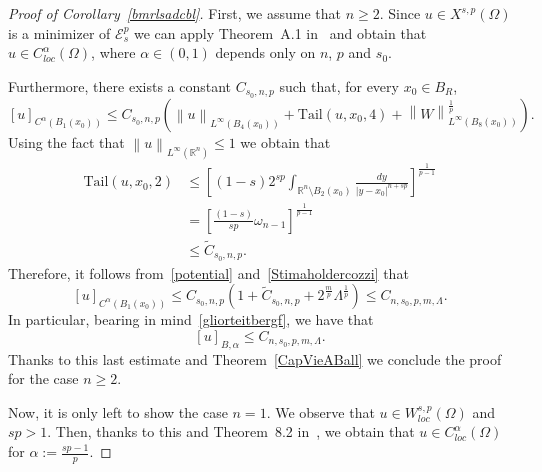 \documentclass[12pt]{article}
\newcommand{\R}{\mathbb{R}}
\numberwithin{equation}{section}
\renewcommand{\leq}{\leqslant}
\renewcommand{\geq}{\geqslant}
\begin{document}
\begin{proof}[Proof of Corollary~\ref{bmrlsadcbl}]
First, we assume that $n\geq 2$. Since $u\in X^{s,p}(\Omega)$ is a minimizer of $\mathcal{E}_s^p$ we can apply Theorem~A.1 in~\cite{DFVERPP} and obtain that $u\in C_{\textit{loc}}^\alpha(\Omega)$, where $\alpha\in (0,1)$ depends only on $n$, $p$ and $s_0$. 

Furthermore, there exists a constant $C_{s_0,n,p}$ such that, for every $x_0\in B_R$,
\begin{equation}\label{Stimaholdercozzi}
\left[u\right]_{C^{\alpha}\left(B_{1}(x_0)\right)} \leq C_{s_0,n,p} \left(\left\|u\right\|_{L^\infty(B_4(x_0))}+\mbox{Tail}(u,x_0,4)+\left\|W\right\|_{L^\infty(B_8(x_0))}^\frac{1}{p}\right).
\end{equation} 
Using the fact that $\left\|u\right\|_{L^\infty(\R^n)}\leq 1$ we obtain that 
\begin{equation*}
\begin{split}
\mbox{Tail}(u,x_0,2) &\leq  \left[(1-s)2^{sp} \int_{\R^n\setminus B_2(x_0)}\frac{dy}{\left|y-x_0\right|^{n+sp}}\right]^\frac{1}{p-1}\\
&=\left[\frac{(1-s)}{sp}\omega_{n-1}\right]^\frac{1}{p-1}\\
&\leq \tilde{C}_{s_0,n,p}. 
\end{split}
\end{equation*}
Therefore, it follows from~\eqref{potential} and~\eqref{Stimaholdercozzi} that 
\begin{equation*}
\left[u\right]_{C^{\alpha}(B_1(x_0))} \leq C_{s_0,n,p}\left(1+\tilde{C}_{s_0,n,p}+2^\frac{m}{p}\Lambda^\frac{1}{p}\right) \leq C_{n,s_0,p,m,\Lambda}. 
\end{equation*}
In particular, bearing in mind~\eqref{gliorteitbergf}, we have that
\begin{equation*}
\left[u\right]_{B,\alpha}\leq C_{n,s_0,p,m,\Lambda}.
\end{equation*} 
Thanks to this last estimate and Theorem~\ref{CapVieABall} we conclude the proof for the case $n\geq 2$. 


Now, it is only left to show the case $n=1$. We observe that $u\in W_{\textit{loc}}^{s,p}(\Omega)$ and $sp>1$. Then, thanks to this and Theorem~8.2 in~\cite{MR2944369}, we obtain that $u\in C_{\textit{loc}}^\alpha(\Omega)$ for $\alpha:=\frac{sp-1}{p}$.


\end{proof}
\end{document}
